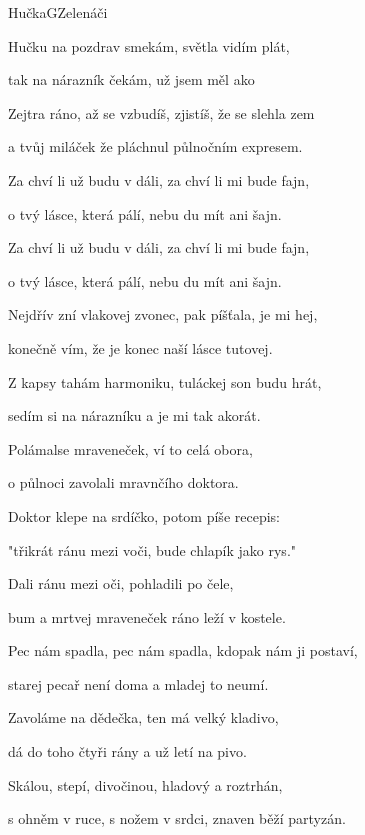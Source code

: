 \begin{song}{Hučka}{G}{Zelenáči}
\begin{SBVerse}
Hučku  na pozdrav smekám, světla  vidím plát,

tak na  nárazník čekám, už jsem  měl ako

Zejtra ráno, až se vzbudíš, zjistíš, že se slehla zem

a tvůj miláček že pláchnul půlnočním expresem.
\end{SBVerse}
\begin{SBChorus}
Za chví li už budu v dáli, za chví li mi bude fajn,

o tvý  lásce, která pálí, nebu du mít ani  šajn.

Za chví li už budu v dáli, za chví li mi bude fajn,

o tvý  lásce, která pálí, nebu du mít ani  šajn.
\end{SBChorus}
\begin{SBVerse}
Nejdřív zní vlakovej zvonec, pak píšťala, je mi hej,

konečně vím, že je konec naší lásce tutovej.

Z kapsy tahám harmoniku, tuláckej son budu hrát,

sedím si na nárazníku a je mi tak akorát. 
\end{SBVerse}
\begin{SBVerse}
Polámalse mraveneček, ví to celá obora,

o půlnoci zavolali mravnčího doktora.

Doktor klepe na srdíčko, potom píše recepis:

"třikrát ránu mezi voči, bude chlapík jako rys."

Dali ránu mezi oči, pohladili po čele,

bum a mrtvej mraveneček ráno leží v kostele.
\end{SBVerse}
\begin{SBVerse}
Pec nám spadla, pec nám spadla, kdopak nám ji postaví,

starej pecař není doma a mladej to neumí.

Zavoláme na dědečka, ten má velký kladivo,

dá do toho čtyři rány a už letí na pivo.
\end{SBVerse}
\begin{SBVerse}
Skálou, stepí, divočinou, hladový a roztrhán,

s ohněm v ruce, s nožem v srdci, znaven běží partyzán.
\end{SBVerse}
\end{song}

\pagebreak
